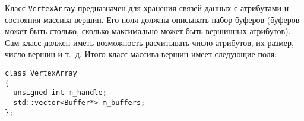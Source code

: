 \documentclass[a4paper, 12pt]{article}
\begin{document}
Класс \texttt{VertexArray} предназначен для хранения связей данных с атрибутами
и состояния массива вершин. Его поля должны описывать набор буферов (буферов
может быть столько, сколько максимально может быть вершинных атрибутов). Сам
класс должен иметь возможность расчитывать число атрибутов, их размер, число
вершин и т.~д. Итого класс массива вершин имеет следующие поля:

\begin{verbatim}
class VertexArray
{
  unsigned int m_handle;
  std::vector<Buffer*> m_buffers;
};
\end{verbatim}
\end{document}
